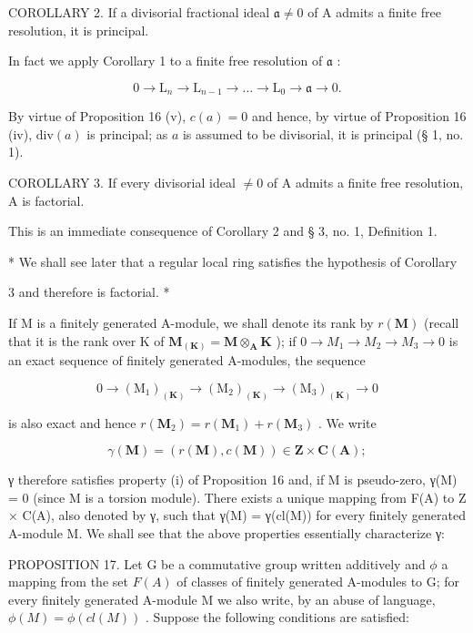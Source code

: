 COROLLARY 2. If a divisorial fractional ideal \(\mathfrak{a} \neq 0\) of A admits a finite free resolution, it is principal.

In fact we apply Corollary 1 to a finite free resolution of \(\mathfrak{a}\) :

\[
0 \rightarrow \mathrm{L} _ {n} \rightarrow \mathrm{L} _ {n - 1} \rightarrow \dots \rightarrow \mathrm{L} _ {0} \rightarrow \mathfrak {a} \rightarrow 0.
\]

By virtue of Proposition 16 (v), \(c(a) = 0\) and hence, by virtue of Proposition 16 (iv), \(\text{div}(a)\) is principal; as \(a\) is assumed to be divisorial, it is principal (§ 1, no. 1).

COROLLARY 3. If every divisorial ideal \(\neq 0\) of A admits a finite free resolution, A is factorial.

This is an immediate consequence of Corollary 2 and § 3, no. 1, Definition 1.

* We shall see later that a regular local ring satisfies the hypothesis of Corollary

3 and therefore is factorial. *

If M is a finitely generated A-module, we shall denote its rank by \(r(\mathbf{M})\) (recall that it is the rank over K of \(\mathbf{M}_{(\mathbf{K})} = \mathbf{M} \otimes_{\mathbf{A}} \mathbf{K}\) ); if \(0 \to M_{1} \to M_{2} \to M_{3} \to 0\) is an exact sequence of finitely generated A-modules, the sequence

\[
0 \rightarrow (\mathrm{M} _ {1}) _ {(\mathbf {K})} \rightarrow (\mathrm{M} _ {2}) _ {(\mathbf {K})} \rightarrow (\mathrm{M} _ {3}) _ {(\mathbf {K})} \rightarrow 0
\]

is also exact and hence \(r(\mathbf{M}_2) = r(\mathbf{M}_1) + r(\mathbf{M}_3)\) . We write

\[
\gamma (\mathbf {M}) = (r (\mathbf {M}), c (\mathbf {M})) \in \mathbf {Z} \times \mathbf {C} (\mathbf {A});
\]

γ therefore satisfies property (i) of Proposition 16 and, if M is pseudo-zero, γ(M) = 0 (since M is a torsion module). There exists a unique mapping from F(A) to Z × C(A), also denoted by γ, such that γ(M) = γ(cl(M)) for every finitely generated A-module M. We shall see that the above properties essentially characterize γ:

PROPOSITION 17. Let G be a commutative group written additively and \(\phi\) a mapping from the set \(F(A)\) of classes of finitely generated A-modules to G; for every finitely generated A-module M we also write, by an abuse of language, \(\phi(M) = \phi(cl(M))\) . Suppose the following conditions are satisfied:

